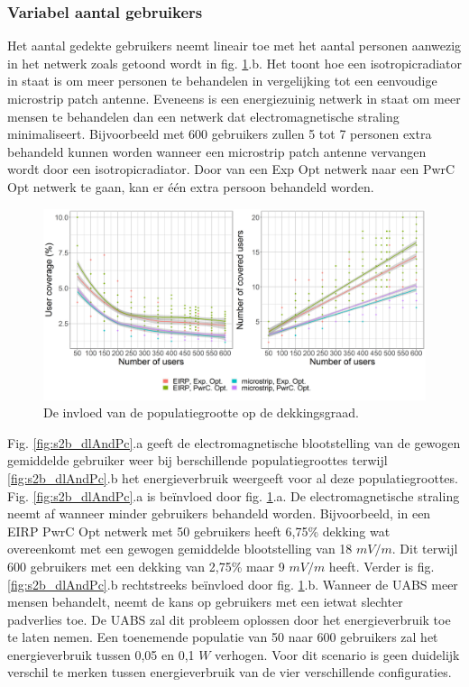 \documentclass[twocolumn]{phdsymp_dutch}
\begin{document}
\subsubsection{Variabel aantal gebruikers}
Het aantal gedekte gebruikers neemt lineair toe met het aantal personen aanwezig in het netwerk zoals getoond wordt in fig.
\ref{fig:s2uvsnumcovusers}.b. Het toont hoe een \gls{isotropicradiator} in staat is om meer personen te behandelen in vergelijking tot een eenvoudige
 microstrip patch antenne. Eveneens is een energiezuinig netwerk in staat om meer mensen te behandelen dan een netwerk dat electromagnetische straling minimaliseert.
 Bijvoorbeeld met 600 gebruikers zullen 5 tot 7 personen extra behandeld kunnen worden wanneer 
 een microstrip patch antenne vervangen wordt door een  \gls{isotropicradiator}.
Door van een \gls{Exp Opt} netwerk naar een \gls{PwrC Opt} netwerk te gaan, kan er \'e\'en extra persoon 
behandeld worden.

\begin{figure}[h!]
  \includegraphics[width=\linewidth]{s2/uvsnumdronesAndCov.png}
  \caption{De invloed van de populatiegrootte op de dekkingsgraad.}
  \label{fig:s2uvsnumcovusers}
\end{figure}

Fig. \ref{fig:s2b_dlAndPc}.a geeft de electromagnetische blootstelling van de gewogen gemiddelde gebruiker weer 
bij berschillende populatiegroottes terwijl 
\ref{fig:s2b_dlAndPc}.b het energieverbruik weergeeft voor al deze populatiegroottes.
Fig. \ref{fig:s2b_dlAndPc}.a  is be\"invloed door fig. \ref{fig:s2uvsnumcovusers}.a. 
De electromagnetische straling neemt af wanneer minder gebruikers behandeld worden.
Bijvoorbeeld, in een EIRP \gls{PwrC Opt} netwerk met 50 gebruikers heeft 6,75\%
dekking wat overeenkomt met een gewogen gemiddelde blootstelling van 18 $mV/m$. Dit terwijl
 600 gebruikers met een dekking van 2,75\% maar 9 $mV/m$ heeft.
Verder is fig. \ref{fig:s2b_dlAndPc}.b rechtstreeks be\"invloed door fig.  \ref{fig:s2uvsnumcovusers}.b.
Wanneer de \gls{UABS} meer mensen behandelt, neemt de kans op gebruikers met een ietwat slechter padverlies toe.
De  \gls{UABS} zal dit probleem oplossen door het energieverbruik toe te laten nemen.
Een toenemende populatie van 50 naar 600 gebruikers zal het energieverbruik tussen 0,05 en 0,1 $W$ verhogen.
Voor dit scenario is geen duidelijk verschil te merken tussen energieverbruik van de vier verschillende configuraties.
\end{document}
